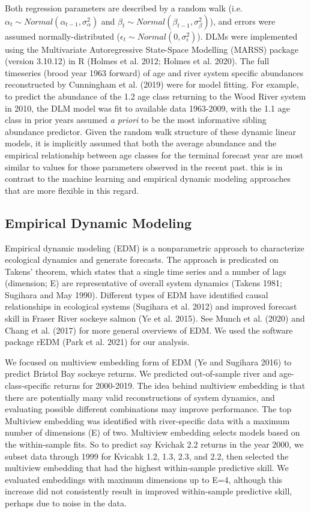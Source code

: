 \documentclass[
]{article}
\begin{document}
Both regression parameters are described by a random walk (i.e.~\(\alpha_t \sim Normal(\alpha_{t-1},\sigma^2_{\alpha})\) and \(\beta_t \sim Normal(\beta_{t-1},\sigma^2_{\beta})\)), and errors were assumed normally-distributed (\(\epsilon_t \sim Normal(0,\sigma^2_{\epsilon})\)). DLMs were implemented using the Multivariate Autoregressive State-Space Modelling (MARSS) package (version 3.10.12) in R (Holmes et al. 2012; Holmes et al. 2020). The full timeseries (brood year 1963 forward) of age and river system specific abundances reconstructed by Cunningham et al. (2019) were for model fitting. For example, to predict the abundance of the 1.2 age class returning to the Wood River system in 2010, the DLM model was fit to available data 1963-2009, with the 1.1 age class in prior years assumed \emph{a priori} to be the most informative sibling abundance predictor. Given the random walk structure of these dynamic linear models, it is implicitly assumed that both the average abundance and the empirical relationship between age classes for the terminal forecast year are most similar to values for those parameters observed in the recent past. this is in contrast to the machine learning and empirical dynamic modeling approaches that are more flexible in this regard.

\hypertarget{empirical-dynamic-modeling}{%
\subsection{Empirical Dynamic Modeling}\label{empirical-dynamic-modeling}}

Empirical dynamic modeling (EDM) is a nonparametric approach to characterize ecological dynamics and generate forecasts. The approach is predicated on Takens' theorem, which states that a single time series and a number of lags (dimension; E) are representative of overall system dynamics (Takens 1981; Sugihara and May 1990). Different types of EDM have identified causal relationships in ecological systems (Sugihara et al. 2012) and improved forecast skill in Fraser River sockeye salmon (Ye et al. 2015). See Munch et al. (2020) and Chang et al. (2017) for more general overviews of EDM. We used the software package rEDM (Park et al. 2021) for our analysis.

We focused on multiview embedding form of EDM (Ye and Sugihara 2016) to predict Bristol Bay sockeye returns. We predicted out-of-sample river and age-class-specific returns for 2000-2019. The idea behind multiview embedding is that there are potentially many valid reconstructions of system dynamics, and evaluating possible different combinations may improve performance. The top Multiview embedding was identified with river-specific data with a maximum number of dimensions (E) of two. Multiview embedding selects models based on the within-sample fits. So to predict say Kvichak 2.2 returns in the year 2000, we subset data through 1999 for Kvicahk 1.2, 1.3, 2.3, and 2.2, then selected the multiview embedding that had the highest within-sample predictive skill. We evaluated embeddings with maximum dimensions up to E=4, although this increase did not consistently result in improved within-sample predictive skill, perhaps due to noise in the data.
\end{document}
